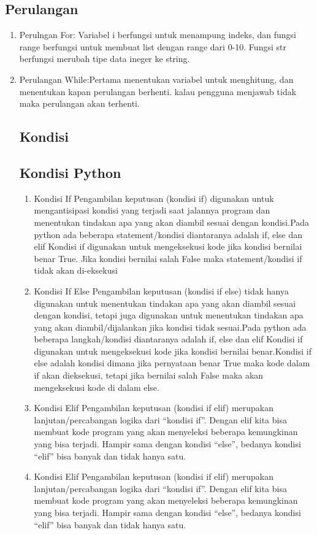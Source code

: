 \begin{enumerate}
\begin{enumerate}
\section{Perulangan}
    \begin{enumerate}
      \item Perulngan For: Variabel i berfungsi untuk menampung indeks, dan fungsi range berfungsi untuk membuat list dengan range dari 0-10. Fungsi str berfungsi merubah tipe data ineger ke string.
      \item Perulangan While:Pertama menentukan variabel untuk menghitung, dan menentukan kapan perulangan berhenti. kalau pengguna menjawab tidak maka perulangan akan terhenti.
\section{Kondisi}
\subsection{Kondisi Python}
     \begin{enumerate}
     \item Kondisi If
      Pengambilan keputusan (kondisi if) digunakan untuk mengantisipasi kondisi yang terjadi saat jalannya program dan menentukan tindakan apa yang akan diambil sesuai dengan kondisi.Pada python ada beberapa statement/kondisi diantaranya adalah if, else dan elif Kondisi if digunakan untuk mengeksekusi kode jika kondisi bernilai benar True.
      Jika kondisi bernilai salah False maka statement/kondisi if tidak akan di-eksekusi
     \item Kondisi If Else
      Pengambilan keputusan (kondisi if else) tidak hanya digunakan untuk menentukan tindakan apa yang akan diambil sesuai dengan kondisi, tetapi juga digunakan untuk menentukan tindakan apa yang akan diambil/dijalankan jika kondisi tidak sesuai.Pada python ada beberapa langkah/kondisi diantaranya adalah if, else dan elif Kondisi if digunakan untuk mengeksekusi kode jika kondisi bernilai benar.Kondisi if else adalah kondisi dimana jika pernyataan benar True maka kode dalam if akan dieksekusi, tetapi jika bernilai salah False maka akan mengeksekusi kode di dalam else.
    \item Kondisi Elif
     Pengambilan keputusan (kondisi if elif) merupakan lanjutan/percabangan logika dari “kondisi if”. Dengan elif kita bisa membuat kode program yang akan menyeleksi beberapa kemungkinan yang bisa terjadi. Hampir sama dengan kondisi “else”, bedanya kondisi “elif” bisa banyak dan tidak hanya satu.
     \item Kondisi Elif
     Pengambilan keputusan (kondisi if elif) merupakan lanjutan/percabangan logika dari “kondisi if”. Dengan elif kita bisa membuat kode program yang akan menyeleksi beberapa kemungkinan yang bisa terjadi. Hampir sama dengan kondisi “else”, bedanya kondisi “elif” bisa banyak dan tidak hanya satu.

\end{enumerate}
\end{enumerate}
\end{enumerate}
\end{enumerate}
